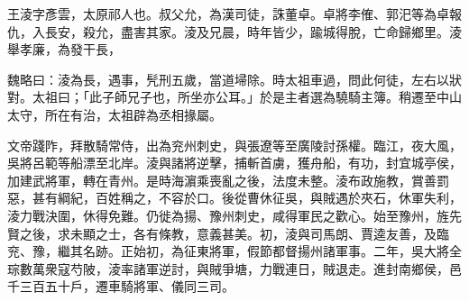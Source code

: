 
\begin{pinyinscope}
王淩字彥雲，太原祁人也。叔父允，為漢司徒，誅董卓。卓將李傕、郭汜等為卓報仇，入長安，殺允，盡害其家。淩及兄晨，時年皆少，踰城得脫，亡命歸鄉里。淩舉孝廉，為發干長，

魏略曰：淩為長，遇事，髠刑五歲，當道埽除。時太祖車過，問此何徒，左右以狀對。太祖曰；「此子師兄子也，所坐亦公耳。」於是主者選為驍騎主簿。稍遷至中山太守，所在有治，太祖辟為丞相掾屬。

文帝踐阼，拜散騎常侍，出為兖州刺史，與張遼等至廣陵討孫權。臨江，夜大風，吳將呂範等船漂至北岸。淩與諸將逆擊，捕斬首虜，獲舟船，有功，封宜城亭侯，加建武將軍，轉在青州。是時海濵乘喪亂之後，法度未整。淩布政施教，賞善罰惡，甚有綱紀，百姓稱之，不容於口。後從曹休征吳，與賊遇於夾石，休軍失利，淩力戰決圍，休得免難。仍徙為揚、豫州刺史，咸得軍民之歡心。始至豫州，旌先賢之後，求未顯之士，各有條教，意義甚美。初，淩與司馬朗、賈逵友善，及臨兖、豫，繼其名跡。正始初，為征東將軍，假節都督揚州諸軍事。二年，吳大將全琮數萬衆寇芍陂，淩率諸軍逆討，與賊爭塘，力戰連日，賊退走。進封南鄉侯，邑千三百五十戶，遷車騎將軍、儀同三司。


\end{pinyinscope}
